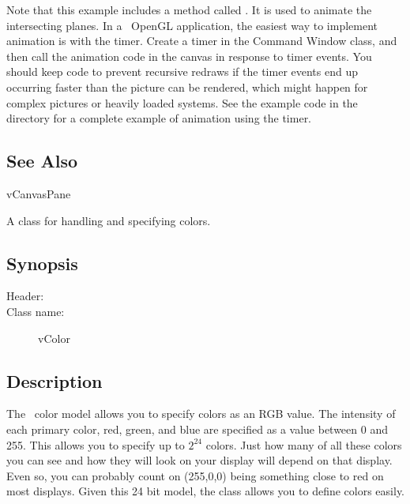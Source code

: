 Note that this example includes a method called .
It is used to animate the intersecting planes. In a \V\
OpenGL application, the easiest way to implement animation
is with the timer. Create a timer in the Command Window
class, and then call the animation code in the canvas
in response to timer events. You should keep code to
prevent recursive redraws if the timer events end up
occurring faster than the picture can be rendered, which
might happen for complex pictures or heavily loaded systems.
See the example code in the  directory for
a complete example of animation using the timer.

\subsection* {See Also} %

vCanvasPane



A class for handling and specifying colors.

\subsection* {Synopsis}

\begin{description}
	\item [Header:] 
	\item [Class name:] vColor
\end{description}

\subsection* {Description}

The \V\ color model allows you to specify colors as an RGB value.
\index{color!RGB model}
The intensity of each primary color, red, green, and blue are
specified as a value between 0 and 255. This allows you to
specify up to $2^{24}$ colors. Just how many of all these
colors you can see and how they will look on your display will
depend on that display. Even so, you can probably count  on
(255,0,0) being something close to red on most displays. Given
this 24 bit model, the  class allows you to define
colors easily.

